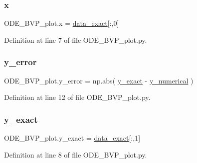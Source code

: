\subsubsection{\texorpdfstring{x}{x}}
{\footnotesize\ttfamily O\+D\+E\+\_\+\+B\+V\+P\+\_\+plot.\+x = \hyperlink{namespaceODE__BVP__plot_a622c61e641f1695a3b9cc06bed3fbb3e}{data\+\_\+exact}\mbox{[}\+:,0\mbox{]}}



Definition at line 7 of file O\+D\+E\+\_\+\+B\+V\+P\+\_\+plot.\+py.

\mbox{\label{namespaceODE__BVP__plot_a8db68424e12aa3dfa6fd2c118cba6e7c}} 
\subsubsection{\texorpdfstring{y\+\_\+error}{y\_error}}
{\footnotesize\ttfamily O\+D\+E\+\_\+\+B\+V\+P\+\_\+plot.\+y\+\_\+error = np.\+abs( \hyperlink{namespaceODE__BVP__plot_af37cba4830d7dec912ee2028d4d32f54}{y\+\_\+exact} -\/ \hyperlink{namespaceODE__BVP__plot_a2c83010c60bfd7d0f8d05c96300c8a5f}{y\+\_\+numerical} )}



Definition at line 12 of file O\+D\+E\+\_\+\+B\+V\+P\+\_\+plot.\+py.

\mbox{\label{namespaceODE__BVP__plot_af37cba4830d7dec912ee2028d4d32f54}} 
\subsubsection{\texorpdfstring{y\+\_\+exact}{y\_exact}}
{\footnotesize\ttfamily O\+D\+E\+\_\+\+B\+V\+P\+\_\+plot.\+y\+\_\+exact = \hyperlink{namespaceODE__BVP__plot_a622c61e641f1695a3b9cc06bed3fbb3e}{data\+\_\+exact}\mbox{[}\+:,1\mbox{]}}



Definition at line 8 of file O\+D\+E\+\_\+\+B\+V\+P\+\_\+plot.\+py.

\mbox{\label{namespaceODE__BVP__plot_a2c83010c60bfd7d0f8d05c96300c8a5f}} 
